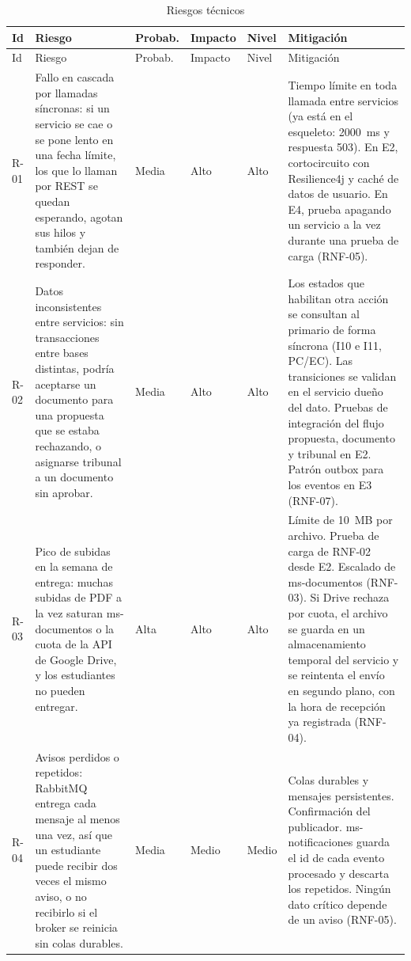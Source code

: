 \begingroup
\footnotesize
\setlength{\tabcolsep}{3pt}
\begin{longtable}{@{}L{0.9cm}L{4.7cm}L{1.3cm}L{1.3cm}L{1.1cm}L{5.4cm}@{}}
\caption{Riesgos técnicos}\label{tab:riesgos}\\
\toprule
Id & Riesgo & Probab. & Impacto & Nivel & Mitigación \\
\midrule
\endfirsthead
\toprule
Id & Riesgo & Probab. & Impacto & Nivel & Mitigación \\
\midrule
\endhead
\endfoot
\bottomrule
\endlastfoot
R-01 & Fallo en cascada por llamadas síncronas: si un servicio se cae o se pone lento en una fecha límite, los que lo llaman por REST se quedan esperando, agotan sus hilos y también dejan de responder. & Media & Alto & Alto & Tiempo límite en toda llamada entre servicios (ya está en el esqueleto: 2000~ms y respuesta 503). En E2, cortocircuito con Resilience4j y caché de datos de usuario. En E4, prueba apagando un servicio a la vez durante una prueba de carga (RNF-05). \\
\midrule
R-02 & Datos inconsistentes entre servicios: sin transacciones entre bases distintas, podría aceptarse un documento para una propuesta que se estaba rechazando, o asignarse tribunal a un documento sin aprobar. & Media & Alto & Alto & Los estados que habilitan otra acción se consultan al primario de forma síncrona (I10 e I11, PC/EC). Las transiciones se validan en el servicio dueño del dato. Pruebas de integración del flujo propuesta, documento y tribunal en E2. Patrón outbox para los eventos en E3 (RNF-07). \\
\midrule
R-03 & Pico de subidas en la semana de entrega: muchas subidas de PDF a la vez saturan ms-documentos o la cuota de la API de Google Drive, y los estudiantes no pueden entregar. & Alta & Alto & Alto & Límite de 10~MB por archivo. Prueba de carga de RNF-02 desde E2. Escalado de ms-documentos (RNF-03). Si Drive rechaza por cuota, el archivo se guarda en un almacenamiento temporal del servicio y se reintenta el envío en segundo plano, con la hora de recepción ya registrada (RNF-04). \\
\midrule
R-04 & Avisos perdidos o repetidos: RabbitMQ entrega cada mensaje al menos una vez, así que un estudiante puede recibir dos veces el mismo aviso, o no recibirlo si el broker se reinicia sin colas durables. & Media & Medio & Medio & Colas durables y mensajes persistentes. Confirmación del publicador. ms-notificaciones guarda el id de cada evento procesado y descarta los repetidos. Ningún dato crítico depende de un aviso (RNF-05). \\

\end{longtable}
